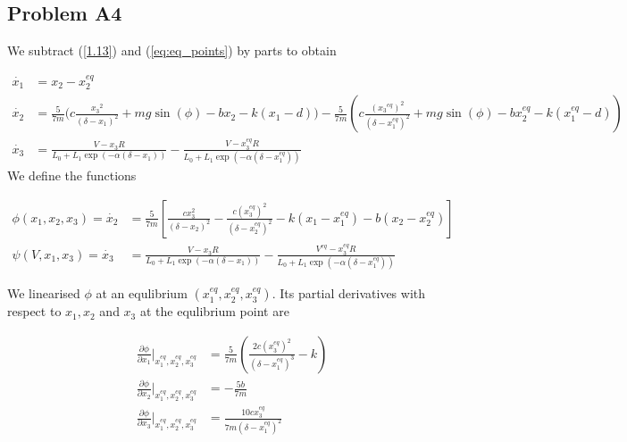 \documentclass[a4paper,10pt,reqno]{amsart}
\numberwithin{equation}{section}
\begin{document}
\subsection{Problem A4}\label{sec:a4}
We subtract (\ref{1.13}) and (\ref{eq:eq_points}) by parts to obtain

\begin{subequations}
     \begin{align}
          \dot{x_1} &= x_2 - x_2^{eq} \\
          \dot{x_2} &=  \frac{5}{7m}\bigg(c \frac{{x_3}^2}{(\delta - x_1)^2} + mg\sin(\phi) - bx_2 - k(x_1-d)\bigg) - \frac{5}{7m}\left(c \frac{({x_3}^{eq})^2}{(\delta - x_1^{eq})^2} + mg\sin(\phi) - bx_2^{eq} - k(x_1^{eq}-d)\right) \label{eq:x2dot}\\
          \dot{x_3} &= \frac{V - x_3R}{L_0 + L_1\exp(-\alpha(\delta - x_1))} - \frac{V - x_3^{eq}R}{L_0 + L_1\exp(-\alpha(\delta - x_1^{eq}))} \label{eq:x3dot}
     \end{align}
\end{subequations}\newline
We define the functions

\begin{subequations}
    \begin{align}
         \phi(x_1, x_2, x_3) = \dot{x_2} &= \frac{5}{7m}\left[\frac{cx_3^2}{(\delta - x_2)^2} - \frac{c(x_3^{eq})^2}{(\delta - x_2^{eq})^2} - k(x_1 - x_1^{eq}) - b(x_2 - x_2^{eq})\right] \\
         \psi(V, x_1, x_3) = \dot{x_3} &= \frac{V - x_3R}{L_0 + L_1\exp(-\alpha(\delta - x_1))} - \frac{V^{eq} - x_3^{eq}R}{L_0 + L_1\exp(-\alpha(\delta - x_1^{eq}))}
    \end{align}
\end{subequations}

We linearised $\phi$ at an equlibrium $(x_1^{eq}, x_2^{eq}, x_3^{eq})$. Its partial derivatives with respect to $x_1, x_2$ and $x_3$ at the equlibrium point are

\begin{subequations}\label{eq:phiDeriv}
     \begin{align}
          \frac{\partial\phi}{\partial x_1}\Bigg|_{x_1^{eq}, x_2^{eq}, x_3^{eq}} &= \frac{5}{7 m}\left(\frac{2 c (x_3^{eq})^{2}}{\left(\delta - x_{1}^{eq}\right)^{3}} - k\right) \\
          \frac{\partial\phi}{\partial x_2}\Bigg|_{x_1^{eq}, x_2^{eq}, x_3^{eq}} &= - \frac{5 b}{7 m} \\
          \frac{\partial\phi}{\partial x_3}\Bigg|_{x_1^{eq}, x_2^{eq}, x_3^{eq}} &= \frac{10 c x_{3}^{eq}}{7 m \left(\delta - x_{1}^{eq}\right)^{2}}
     \end{align}
\end{subequations}
\end{document}
